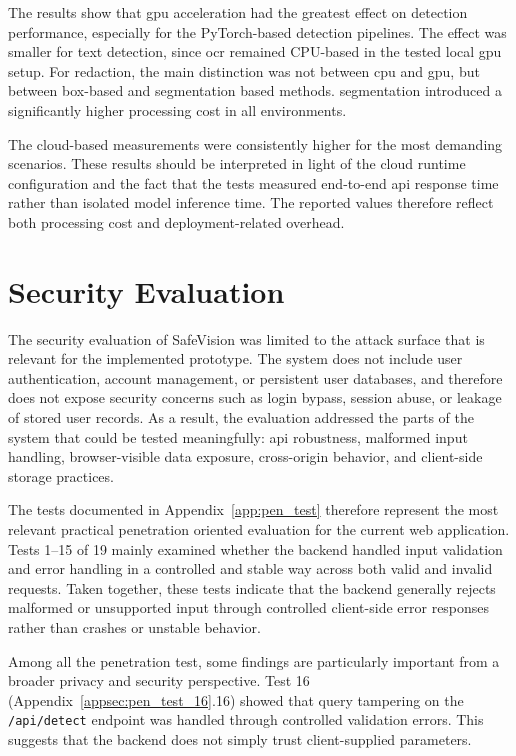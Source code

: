 The results show that \gls{gpu} acceleration had the greatest effect on
detection performance, especially for the PyTorch-based detection pipelines. The effect was smaller for text detection, since \acrshort{ocr} remained CPU-based in the tested local \gls{gpu} setup. For redaction, the main distinction was not between \gls{cpu} and \gls{gpu}, but between box-based and \gls{segmentation} based methods. \Gls{segmentation} introduced a significantly higher processing cost in all environments.

The cloud-based measurements were consistently higher for the most demanding scenarios. These results should be interpreted in light of the cloud runtime configuration and the fact that the tests measured end-to-end \acrshort{api} response time rather than isolated model \gls{inference} time. The reported values therefore reflect both processing cost and deployment-related overhead.

\section{Security Evaluation}
\label{sec:security_evaluation}

The security evaluation of \gls{SafeVision} was limited to the attack surface that is relevant for the implemented prototype. The system does not include user authentication, account management, or persistent user databases, and therefore does not expose security concerns such as login bypass, session abuse, or leakage of stored user records. As a result, the evaluation addressed the parts of the system that could be tested meaningfully: \acrshort{api} robustness, malformed input handling, browser-visible data exposure, cross-origin behavior, and client-side storage practices.

The tests documented in Appendix~\ref{app:pen_test} therefore represent the most relevant practical penetration oriented evaluation for the current web application. Tests 1--15 of 19 mainly examined whether the backend handled input validation and error handling in a controlled and stable way across both valid and invalid requests. Taken together, these tests indicate that the backend generally rejects malformed or unsupported input through controlled client-side error responses rather than crashes or unstable behavior. 

Among all the penetration test, some findings are particularly important from a broader privacy and security perspective. Test 16 (Appendix~\ref{appsec:pen_test_16}.16) showed that query tampering on the \texttt{/api/detect} endpoint was handled through controlled validation errors. This suggests that the backend does not simply trust client-supplied parameters.

